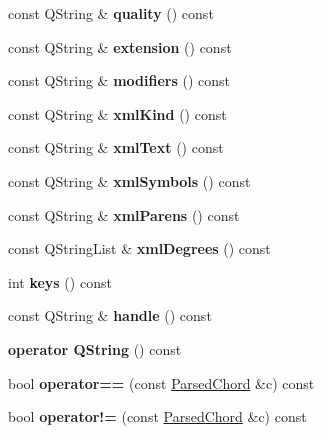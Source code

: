 \begin{DoxyCompactItemize}
const Q\+String \& {\bfseries quality} () const
\item 
\mbox{\label{class_ms_1_1_parsed_chord_a7205457e7e7eaef9f49e1fdbe0c60f52}} 
const Q\+String \& {\bfseries extension} () const
\item 
\mbox{\label{class_ms_1_1_parsed_chord_ad873ae28dccae802ba6c201e75ceaa5b}} 
const Q\+String \& {\bfseries modifiers} () const
\item 
\mbox{\label{class_ms_1_1_parsed_chord_a604f6d76346b470db20868f7ca899571}} 
const Q\+String \& {\bfseries xml\+Kind} () const
\item 
\mbox{\label{class_ms_1_1_parsed_chord_a99b1289be066cf374aee7a15994ef494}} 
const Q\+String \& {\bfseries xml\+Text} () const
\item 
\mbox{\label{class_ms_1_1_parsed_chord_aaca908d1c9ced2d3842525b5c1bb1bf5}} 
const Q\+String \& {\bfseries xml\+Symbols} () const
\item 
\mbox{\label{class_ms_1_1_parsed_chord_aef5b92f857adb2b45fa81349282b016f}} 
const Q\+String \& {\bfseries xml\+Parens} () const
\item 
\mbox{\label{class_ms_1_1_parsed_chord_aac6f2d688573ee2e4c5f0b37e3bb90d2}} 
const Q\+String\+List \& {\bfseries xml\+Degrees} () const
\item 
\mbox{\label{class_ms_1_1_parsed_chord_a4629b6cd93137de0ad87fc0dcb1272e4}} 
int {\bfseries keys} () const
\item 
\mbox{\label{class_ms_1_1_parsed_chord_a240ba1149add3c1bcc52ae228e67960d}} 
const Q\+String \& {\bfseries handle} () const
\item 
\mbox{\label{class_ms_1_1_parsed_chord_a9d035d2d3794c39cea4795433794a888}} 
{\bfseries operator Q\+String} () const
\item 
\mbox{\label{class_ms_1_1_parsed_chord_a093a18209044676bb9a842a624d88597}} 
bool {\bfseries operator==} (const \hyperlink{class_ms_1_1_parsed_chord}{Parsed\+Chord} \&c) const
\item 
\mbox{\label{class_ms_1_1_parsed_chord_a0ab6557e9a92be61da800a0abbff271c}} 
bool {\bfseries operator!=} (const \hyperlink{class_ms_1_1_parsed_chord}{Parsed\+Chord} \&c) const
\end{DoxyCompactItemize}


